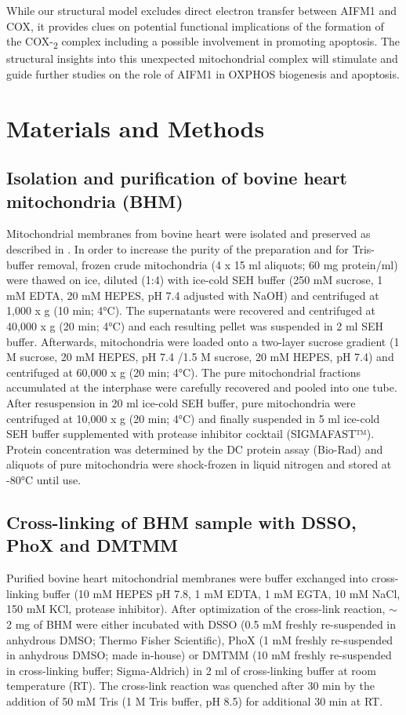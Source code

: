 While our structural model excludes direct electron transfer between AIFM1 and COX, it provides clues on potential functional implications of the formation of the COX-\textsubscript{2} complex including a possible involvement in promoting apoptosis. The structural insights into this unexpected mitochondrial complex will stimulate and guide further studies on the role of AIFM1 in OXPHOS biogenesis and apoptosis.
%
\section{Materials and Methods}
%
\subsection*{Isolation and purification of bovine heart mitochondria (BHM)}
Mitochondrial membranes from bovine heart were isolated and preserved as described in \cite{RN11}. In order to increase the purity of the preparation and for Tris-buffer removal, frozen crude mitochondria (4 x 15 ml aliquots; 60 mg protein/ml) were thawed on ice, diluted (1:4) with ice-cold SEH buffer (250 mM sucrose, 1 mM EDTA, 20 mM HEPES, pH 7.4 adjusted with NaOH) and centrifuged at 1,000 x g (10 min; 4°C). The supernatants were recovered and centrifuged at 40,000 x g (20 min; 4°C) and each resulting pellet was suspended in 2 ml SEH buffer. Afterwards, mitochondria were loaded onto a two-layer sucrose gradient (1 M sucrose, 20 mM HEPES, pH 7.4 /1.5 M sucrose, 20 mM HEPES, pH 7.4) and centrifuged at 60,000 x g (20 min; 4°C). The pure mitochondrial fractions accumulated at the interphase were carefully recovered and pooled into one tube. After resuspension in 20 ml ice-cold SEH buffer, pure mitochondria were centrifuged at 10,000 x g (20 min; 4°C) and finally suspended in 5 ml ice-cold SEH buffer supplemented with protease inhibitor cocktail (SIGMAFAST™). Protein concentration was determined by the DC protein assay (Bio-Rad) and aliquots of pure mitochondria were shock-frozen in liquid nitrogen and stored at -80°C until use.
%
\subsection*{Cross-linking of BHM sample with DSSO, PhoX and DMTMM}
Purified bovine heart mitochondrial membranes were buffer exchanged into cross-linking buffer (10 mM HEPES pH 7.8, 1 mM EDTA, 1 mM EGTA, 10 mM NaCl, 150 mM KCl, protease inhibitor). After optimization of the cross-link reaction, $\sim$2 mg of BHM were either incubated with DSSO (0.5 mM freshly re-suspended in anhydrous DMSO; Thermo Fisher Scientific), PhoX (1 mM freshly re-suspended in anhydrous DMSO; made in-house) or DMTMM (10 mM freshly re-suspended in cross-linking buffer; Sigma-Aldrich) in 2 ml of cross-linking buffer at room temperature (RT). The cross-link reaction was quenched after 30 min by the addition of 50 mM Tris (1 M Tris buffer, pH 8.5) for additional 30 min at RT.
%
